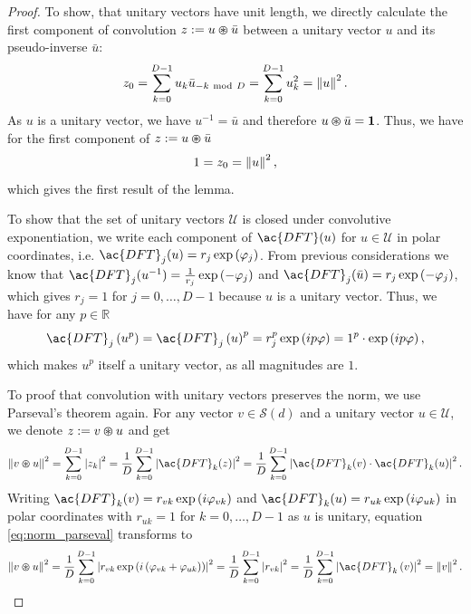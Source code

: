 \begin{proof}
	To show, that unitary vectors have unit length, we directly calculate the first component of convolution $z :=u \varoast \bar{u}$ between a unitary vector $u$ and its pseudo-inverse $\bar{u}$:
	\[
	z_{0} = \sum_{k=0}^{D-1} u_{k} \bar{u}_{-k \ \mathrm{mod}\ D} = \sum_{k=0}^{D-1} u_{k}^{2} = \left\| u \right\|^{2}.
	\]
	As $u$ is a unitary vector, we have $u^{-1} = \bar{u}$ and therefore $u\varoast \bar{u} = \mathbf{1}$.
	Thus, we have for the first component of $z :=u \varoast \bar{u}$
	\[
	1 = z_{0} = \left\| u \right\|^{2},
	\]
	which gives the first result of the lemma.
    
	To show that the set of unitary vectors $\mathcal{U}$ is closed under convolutive exponentiation, we write each component of $\ac{DFT}(u)$ for $u \in \mathcal{U}$ in polar coordinates, i.e. $\ac{DFT}_j(u) = r_j\exp\left(\varphi_j\right)$.
	From previous considerations we know that $\ac{DFT}_j(u^{-1}) = \frac{1}{r_j}\exp\left(-\varphi_j\right)$ and $\ac{DFT}_j(\bar{u}) = r_j\exp\left(-\varphi_j\right)$, which gives $r_j=1$ for $j=0, \ldots, D-1$ because $u$ is a unitary vector.
	Thus, we have for any $p \in \mathbb{R}$
	\[
	\ac{DFT}_j\left(u^{p}\right) = \ac{DFT}_j\left(u\right)^{p} = r_j^{p}\exp\left(ip\varphi\right) = 1^{p} \cdot \exp\left(ip\varphi\right),
	\]
	which makes $u^{p}$ itself a unitary vector, as all magnitudes are $1$.	
    
	To proof that convolution with unitary vectors preserves the norm, we use Parseval's theorem again.
	For any vector $v \in \mathcal{S}(d)$ and  a unitary vector $u \in \mathcal{U}$, we denote $z:= v \varoast u$ and get
	\begin{equation}
	\label{eq:norm_parseval}
	\norm{v \varoast u}^{2} = \sum_{k=0}^{D-1} \left|z_{k}\right|^{2} = \frac{1}{D} \sum_{k=0}^{D-1} \left|\ac{DFT}_{k}(z)\right|^{2} = \frac{1}{D} \sum_{k=0}^{D-1} \left|\ac{DFT}_{k}(v) \cdot \ac{DFT}_{k}(u)\right|^{2}.
	\end{equation}
	Writing $\ac{DFT}_{k}(v) = r_{vk}\exp\left(i\varphi_{vk}\right)$ and $\ac{DFT}_{k}(u) = r_{uk}\exp\left(i\varphi_{uk}\right)$ in polar coordinates with $r_{uk} = 1$ for $k=0, \ldots, D-1$ as $u$ is unitary, equation \ref{eq:norm_parseval} transforms to
	\begin{equation*}
	\norm{v \varoast u}^{2} = \frac{1}{D} \sum_{k=0}^{D-1} \left|r_{vk} \exp\left(i\left(\varphi_{vk} + \varphi_{uk}\right)\right)\right|^{2} = \frac{1}{D} \sum_{k=0}^{D-1} \left|r_{vk}\right|^{2} = \frac{1}{D} \sum_{k=0}^{D-1} \left|\ac{DFT}_k\left(v\right)\right|^{2} = \norm{v}^{2}.
	\end{equation*}
\end{proof}

